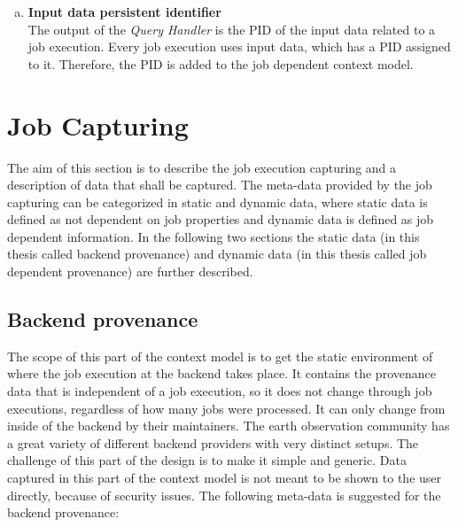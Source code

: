 \documentclass[draft,final]{vutinfth} %
\begin{document}
\begin{enumerate}[(a)]
\item \textbf{Input data persistent identifier} \\
	The output of the \textit{Query Handler} is the PID of the input data related to a job execution. Every job execution uses input data, which has a PID assigned to it. Therefore, the PID is added to the job dependent context model. 
\end{enumerate}

\section{Job Capturing}\label{Design:Job Capturing}
The aim of this section is to describe the job execution capturing and a description of data that shall be captured. The meta-data provided by the job capturing can be categorized in static and dynamic data, where static data is defined as not dependent on job properties and dynamic data is defined as job dependent information. In the following two sections the static data (in this thesis called backend provenance) and dynamic data (in this thesis called job dependent provenance) are further described.     

\subsection{Backend provenance}\label{Design:Backend provenance}
The scope of this part of the context model is to get the static environment of where the job execution at the backend takes place. It contains the provenance data that is independent of a job execution, so it does not change through job executions, regardless of how many jobs were processed. It can only change from inside of the backend by their maintainers. The earth observation community has a great variety of different backend providers with very distinct setups. The challenge of this part of the design is to make it simple and generic. Data captured in this part of the context model is not meant to be shown to the user directly, because of security issues. The following meta-data is suggested for the backend provenance:
\end{document}
